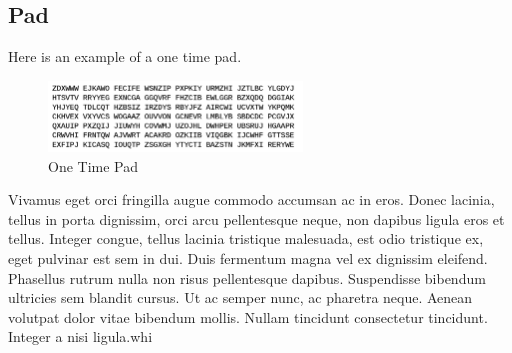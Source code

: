 \hypertarget{pad}{%
\subsection{Pad}\label{pad}}

Here is an example of a one time pad.

\begin{figure}
\vspace{-8pt}
\includegraphics[width=2.65476in,height=0.74254in]{./05_authentication/20_onetime/20_pad/media/image1.png}
\caption{One Time Pad}
\end{figure}



Vivamus eget orci fringilla augue commodo accumsan ac in eros. Donec
lacinia, tellus in porta dignissim, orci arcu pellentesque neque, non
dapibus ligula eros et tellus. Integer congue, tellus lacinia tristique
malesuada, est odio tristique ex, eget pulvinar est sem in dui. Duis
fermentum magna vel ex dignissim eleifend. Phasellus rutrum nulla non
risus pellentesque dapibus. Suspendisse bibendum ultricies sem blandit
cursus. Ut ac semper nunc, ac pharetra neque. Aenean volutpat dolor
vitae bibendum mollis. Nullam tincidunt consectetur tincidunt. Integer a
nisi ligula.whi
